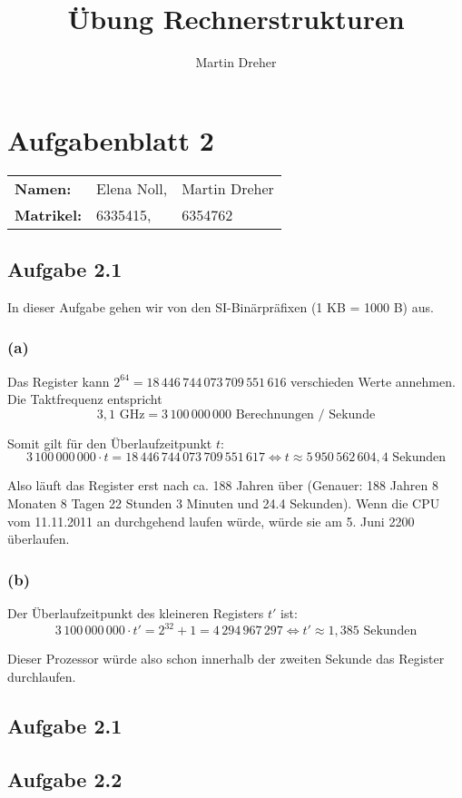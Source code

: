 \documentclass[12pt,a4paper]{article}
\author{Martin Dreher}
\title{Übung Rechnerstrukturen}
\begin{document}
 
 \section*{Aufgabenblatt 2}
 
 \begin{tabular}{l l l}
 \textbf{Namen: } & Elena Noll, & Martin Dreher \\
 \textbf{Matrikel: } & 6335415, & 6354762
 \end{tabular}
 
 \subsection*{Aufgabe 2.1}
 In dieser Aufgabe gehen wir von den SI-Binärpräfixen (1 KB = 1000 B) aus.
 
 \subsubsection*{(a)}
 Das Register kann $2^{64} = 18\,446\,744\,073\,709\,551\,616$ verschieden Werte annehmen. Die Taktfrequenz entspricht
 $$3,1 \textrm{ GHz} = 3\,100\,000\,000 \textrm{ Berechnungen / Sekunde}$$
 
 Somit gilt für den Überlaufzeitpunkt $t$:
 $$3\,100\,000\,000 \cdot t = 18\,446\,744\,073\,709\,551\,617 \Leftrightarrow t \approx 5\,950\,562\,604,4 \textrm{ Sekunden}$$
 
 Also läuft das Register erst nach ca. 188 Jahren über (Genauer: 188 Jahren 8 Monaten 8 Tagen 22 Stunden 3 Minuten und 24.4 Sekunden). Wenn die CPU vom 11.11.2011 an durchgehend laufen würde, würde sie am 5. Juni 2200 überlaufen.
 
 \subsubsection*{(b)}
 
 Der Überlaufzeitpunkt des kleineren Registers $t'$ ist:
 $$3\,100\,000\,000 \cdot t' = 2^{32}+1 = 4\,294\,967\,297 \Leftrightarrow t' \approx 1,385 \textrm{ Sekunden}$$
 
 Dieser Prozessor würde also schon innerhalb der zweiten Sekunde das Register durchlaufen.
 

\subsection*{Aufgabe 2.1}

\subsection*{Aufgabe 2.2}
\end{document}
